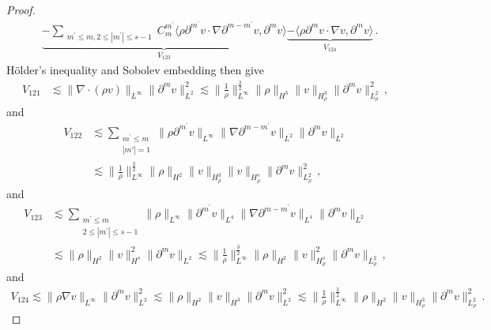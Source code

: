 \documentclass[reqno,11pt]{amsart}
\numberwithin{equation}{section}
\def\p{\partial}
\def\no{\nonumber}
\begin{document}
\begin{proof}
\begin{align}
\no & \underset{V_{123}}{\underbrace{-\sum_{\substack{ m^{\prime}\leq m,2\leq|m^{\prime}|\leq s-1}}C^{m^{\prime}}_m\langle\rho \p^{m^{\prime}}v\cdot\nabla\p^{m-m^{\prime}} v ,\p^mv \rangle}}\underset{V_{124}}{\underbrace{-\langle\rho\p^m v \cdot\nabla v,\p^mv \rangle}} \,.
	\end{align}
H\"older's inequality and Sobolev embedding then give
\begin{equation}\label{v-eq121}
	\begin{aligned}
V_{121}&\lesssim \|\nabla \cdot (\rho v)\|_{L^\infty} \|\partial^m v\|_{L^2}^2 \lesssim \|\frac{1}{\rho}\|_{L^\infty}^{\frac{3}{2}} \|\rho\|_{H^3} \|v\|_{H_\rho^3} \|\partial^m v\|_{L^2_\rho}^2 \,,
	\end{aligned}
\end{equation}
and
\begin{equation}\label{v-eq122}
	\begin{aligned}
V_{122}&\lesssim \sum_{\substack{m^\prime \leq m \\ |m'| = 1}} \|\rho \partial^{m^\prime} v\|_{L^\infty} \|\nabla \partial^{m - m^\prime} v\|_{L^2} \|\partial^m v\|_{L^2} \\&
\lesssim \|\frac{1}{\rho}\|_{L^\infty}^{\frac{3}{2}} \|\rho\|_{H^2} \|v\|_{H^3_\rho} \|v\|_{H^s_\rho} \|\partial^m v\|_{L^2_\rho}^2 \,,
	\end{aligned}
\end{equation}
and
\begin{equation}\label{v-eq123}
	\begin{aligned}
V_{123}&\lesssim \sum_{\substack{m^\prime \leq m \\ 2 \leq |m^\prime| \leq s-1}} \|\rho\|_{L^\infty} \|\partial^{m^\prime} v\|_{L^4} \|\nabla \partial^{m - m^\prime} v\|_{L^4} \|\partial^m v\|_{L^2}\\&
\lesssim \|\rho\|_{H^2} \|v\|_{H^s}^2 \|\partial^m v\|_{L^2} \lesssim \|\frac{1}{\rho}\|_{L^\infty}^{\frac{3}{2}} \|\rho\|_{H^2} \|v\|_{H^s_\rho}^2 \|\partial^m v\|_{L^2_\rho} \,,
	\end{aligned}
\end{equation}
and
\begin{equation}\label{v-eq124}
	\begin{aligned}
V_{124} \lesssim \|\rho \nabla v\|_{L^\infty} \|\partial^m v\|_{L^2}^2 \lesssim \|\rho\|_{H^2} \|v\|_{H^3} \|\partial^m v\|_{L^2}^2 \lesssim \|\frac{1}{\rho}\|_{L^\infty}^{\frac{3}{2}} \|\rho\|_{H^2} \|v\|_{H^3_\rho} \|\partial^m v\|_{L^2_\rho}^2 \,.
	\end{aligned}
\end{equation}

\end{proof}
\end{document}
